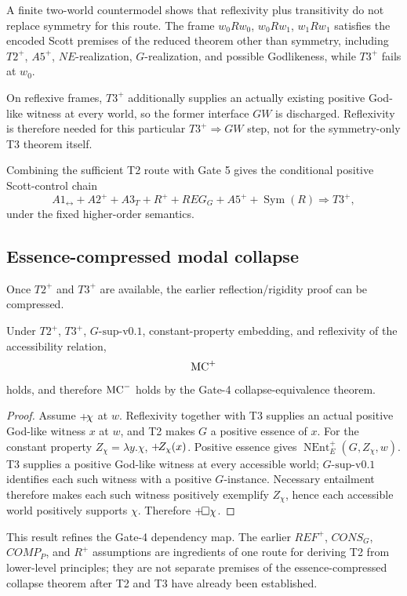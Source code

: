 A finite two-world countermodel shows that reflexivity plus transitivity do not replace symmetry for this route. The frame \(w_0Rw_0\), \(w_0Rw_1\), \(w_1Rw_1\) satisfies the encoded Scott premises of the reduced theorem other than symmetry, including \(T2^+\), \(A5^+\), \(NE\)-realization, \(G\)-realization, and possible Godlikeness, while \(T3^+\) fails at \(w_0\).

On reflexive frames, \(T3^+\) additionally supplies an actually existing positive God-like witness at every world, so the former interface \(GW\) is discharged. Reflexivity is therefore needed for this particular \(T3^+\Rightarrow GW\) step, not for the symmetry-only T3 theorem itself.

Combining the sufficient T2 route with Gate 5 gives the conditional positive Scott-control chain
\[
  A1_{\leftrightarrow}
  +A2^+
  +A3_T
  +R^+
  +REG_G
  +A5^+
  +\operatorname{Sym}(R)
  \Longrightarrow
  T3^+,
\]
under the fixed higher-order semantics.

\subsection{Essence-compressed modal collapse}

Once \(T2^+\) and \(T3^+\) are available, the earlier reflection/rigidity proof can be compressed.

\begin{theorem}
Under \(T2^+\), \(T3^+\), \(G\text{-sup-v0.1}\), constant-property embedding, and reflexivity of the accessibility relation,
\[
  \mathrm{MC}^{+}
\]
holds, and therefore \(\mathrm{MC}^{-}\) holds by the Gate-4 collapse-equivalence theorem.
\end{theorem}
\begin{proof}
Assume \(+\!\chi\) at \(w\). Reflexivity together with T3 supplies an actual positive God-like witness \(x\) at \(w\), and T2 makes \(G\) a positive essence of \(x\). For the constant property \(Z_\chi=\lambda y.\chi\), \(+\!Z_\chi(x)\). Positive essence gives \(\operatorname{NEnt}^{+}_{E}(G,Z_\chi,w)\). T3 supplies a positive God-like witness at every accessible world; \(G\text{-sup-v0.1}\) identifies each such witness with a positive \(G\)-instance. Necessary entailment therefore makes each such witness positively exemplify \(Z_\chi\), hence each accessible world positively supports \(\chi\). Therefore \(+\!\Box\chi\).
\end{proof}

This result refines the Gate-4 dependency map. The earlier \(REF^+\), \(CONS_G\), \(COMP_P\), and \(R^+\) assumptions are ingredients of one route for deriving T2 from lower-level principles; they are not separate premises of the essence-compressed collapse theorem after T2 and T3 have already been established.

